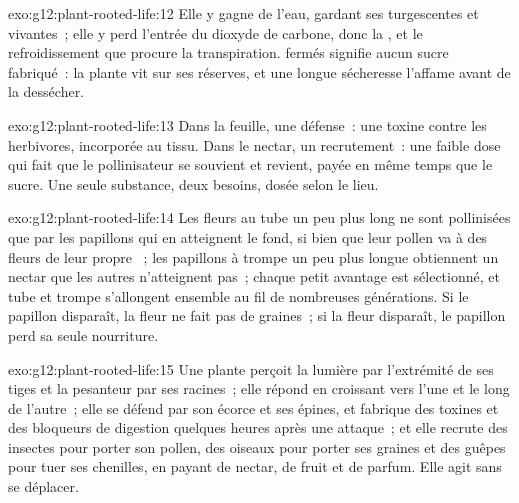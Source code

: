 \begin{solution}{exo:g12:plant-rooted-life:12}
Elle y gagne de l'eau, gardant ses  turgescentes et vivantes~;
elle y perd l'entrée du dioxyde de carbone, donc la , et
le refroidissement que procure la transpiration.  fermés
signifie aucun sucre fabriqué~: la plante vit sur ses réserves, et une
longue sécheresse l'affame avant de la dessécher.
\end{solution}

\begin{solution}{exo:g12:plant-rooted-life:13}
Dans la feuille, une défense~: une toxine contre les herbivores,
incorporée au tissu. Dans le nectar, un recrutement~: une faible dose
qui fait que le pollinisateur se souvient et revient, payée en même
temps que le sucre. Une seule substance, deux besoins, dosée selon le
lieu.
\end{solution}

\begin{solution}{exo:g12:plant-rooted-life:14}
Les fleurs au tube un peu plus long ne sont pollinisées que par les
papillons qui en atteignent le fond, si bien que leur pollen va à des
fleurs de leur propre ~; les papillons à trompe un peu plus
longue obtiennent un nectar que les autres n'atteignent pas~; chaque
petit avantage est sélectionné, et tube et trompe s'allongent ensemble
au fil de nombreuses générations. Si le papillon disparaît, la fleur
ne fait pas de graines~; si la fleur disparaît, le papillon perd sa
seule nourriture.
\end{solution}

\begin{solution}{exo:g12:plant-rooted-life:15}
Une plante perçoit la lumière par l'extrémité de ses tiges et la
pesanteur par ses racines~; elle répond en croissant vers l'une et le
long de l'autre~; elle se défend par son écorce et ses épines, et
fabrique des toxines et des bloqueurs de digestion quelques heures
après une attaque~; et elle recrute des insectes pour porter son
pollen, des oiseaux pour porter ses graines et des guêpes pour tuer
ses chenilles, en payant de nectar, de fruit et de parfum. Elle agit
sans se déplacer.
\end{solution}

